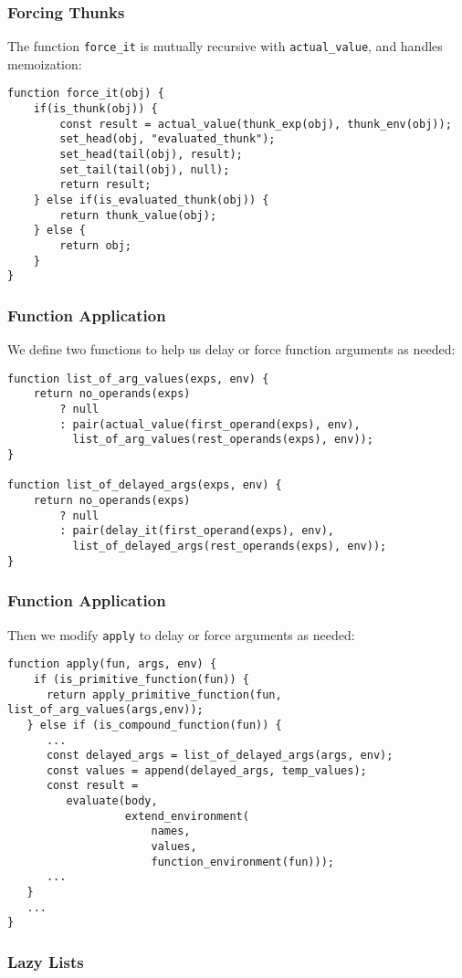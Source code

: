 \documentclass[12pt]{beamer}
\begin{document}
\begin{frame}[fragile]
\frametitle{Forcing Thunks}
The function \texttt{force\_it} is mutually recursive with \texttt{actual\_value}, and handles memoization:
\begin{lstlisting}
function force_it(obj) {
    if(is_thunk(obj)) {        
        const result = actual_value(thunk_exp(obj), thunk_env(obj));        
        set_head(obj, "evaluated_thunk");
        set_head(tail(obj), result);
        set_tail(tail(obj), null);        
        return result;        
    } else if(is_evaluated_thunk(obj)) {        
        return thunk_value(obj);        
    } else {
        return obj;
    }    
}
\end{lstlisting}
\end{frame}

\begin{frame}[fragile]
\frametitle{Function Application}
We define two functions to help us delay or force function arguments as needed:
\begin{lstlisting}
function list_of_arg_values(exps, env) {
    return no_operands(exps)
        ? null
        : pair(actual_value(first_operand(exps), env),
          list_of_arg_values(rest_operands(exps), env));
}

function list_of_delayed_args(exps, env) {
    return no_operands(exps)
        ? null
        : pair(delay_it(first_operand(exps), env),
          list_of_delayed_args(rest_operands(exps), env));
}
\end{lstlisting}
\end{frame}

\begin{frame}[fragile]
\frametitle{Function Application}
Then we modify \texttt{apply} to delay or force arguments as needed:
\begin{lstlisting}
function apply(fun, args, env) {
    if (is_primitive_function(fun)) {
      return apply_primitive_function(fun, list_of_arg_values(args,env));
   } else if (is_compound_function(fun)) {
      ...
      const delayed_args = list_of_delayed_args(args, env);
      const values = append(delayed_args, temp_values);			   
      const result =
         evaluate(body,
                  extend_environment(
                      names,
                      values,
                      function_environment(fun)));
      ...
   }
   ...
}
\end{lstlisting}
\end{frame}

\begin{frame}[fragile]
\frametitle{Lazy Lists}
\end{frame}
\end{document}
